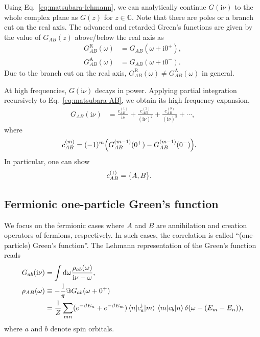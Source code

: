 \documentclass[submission, LectureNotes]{SciPost}
\newcommand\ii{\mathrm{i}}%
\newcommand\iv{\ii\nu}%
\begin{document}
Using Eq.~\eqref{eq:matsubara-lehmann},
we can analytically continue $G(\iv)$ to the whole complex plane as $G(z)$ for $z\in \mathbb{C}$.
Note that there are poles or a branch cut on the real axis.
The advanced and retarded Green's functions are given by the value of $G_{AB}(z)$ above/below the real axis as
\begin{align}
    G^\mathrm{R}_{AB}(\omega) &= G_{AB}(\omega+\ii 0^+),\\
    G^\mathrm{A}_{AB}(\omega) &= G_{AB}(\omega+\ii 0^-).
\end{align}
Due to the branch cut on the real axis, $G^\mathrm{R}_{AB}(\omega) \neq G^\mathrm{A}_{AB}(\omega)$ in general.

At high frequencies, $G(\iv)$ decays in power.
Applying partial integration recursively to Eq.~\eqref{eq:matsubara-AB},
we obtain its high frequency expansion,
\begin{align}
    G_{AB}(\iv) &= 
    \frac{c^{(1)}_{AB}}{\iv} +
    \frac{c^{(2)}_{AB}}{(\iv)^2} +
    \frac{c^{(3)}_{AB}}{(\iv)^3} + \cdots,
\end{align}
where
\begin{align}
    c^{(m)}_{AB} &= (-1)^{m} \qty(G_{AB}^{(m-1)}(0^+) - G_{AB}^{(m-1)}(0^-)).
\end{align}
In particular, one can show
\begin{align}
   c^{(1)}_{AB} &= \poissonbracket{A}{B}.
\end{align}


\subsection{Fermionic one-particle Green's function}
We focus on the fermionic cases where $A$ and $B$ are annihilation and creation operators of fermions, respectively.
In such cases, the correlation is called ``(one-particle) Green's function''.
The Lehmann representation of the Green's function reads
\begin{align}
    G_{ab}(\iv) &= \int \dd \omega \frac{\rho_{ab}(\omega)}{\iv - \omega},\\
    \rho_{AB}(\omega) &\equiv -\frac{1}{\pi} \imaginary G_{ab}(\omega + 0^+)\\
    & = \frac{1}{Z}\sum_{mn}(e^{-\beta E_n} + e^{-\beta E_m})
    \mel{n}{c^\dagger_a}{m}\mel{m}{c_b}{n}
    \delta(\omega - (E_m-E_n)),\label{eq:matsubara-g-lehmann}
\end{align}
where $a$ and $b$ denote spin orbitals.
\end{document}
